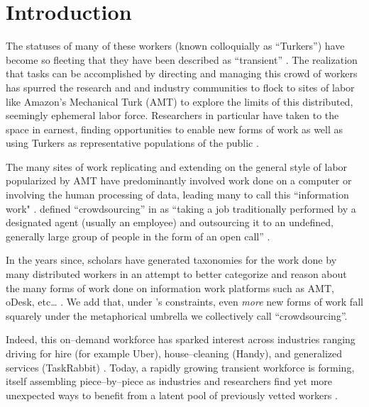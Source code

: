 \documentclass[trackingWork]{subfiles}
\begin{document}

\section{Introduction}
The statuses of many of these workers
(known colloquially as ``Turkers'')
have become so fleeting that 
they have been described as ``transient''
\cite{kargerIterativeLearning,mitraComparingStrategies,latozaCrowdDev}.
The realization
that tasks can be accomplished by directing and managing this crowd of workers
has spurred the research and and industry communities to flock to sites of labor
like Amazon's Mechanical Turk (AMT)
to explore the limits of this distributed, seemingly ephemeral labor force.
Researchers in particular have taken to the space in earnest,
finding opportunities to enable new forms of work
as well as using Turkers
as representative populations of the public
\cite{bernsteinSoylent,redballoon,paolacci2010running}.

The many sites of work replicating and extending on
the general style of labor popularized by AMT
have predominantly involved work done on a computer
or involving the human processing of data,
leading many to call this ``information work"
\cite{turkopticon,professionalCrowdworkEthics,IraniFromCriticalDesign,OlsonMakeDistanceWorkWork}.
\citeauthor{howe2008crowdsourcing} defined ``crowdsourcing'' in \citeyear{howe2008crowdsourcing}
as
``taking a job traditionally performed by a designated agent
(usually an employee)
and outsourcing it to an undefined,
generally large group of people in the form of an open call''
\cite{howe2008crowdsourcing}.

In the years since,
scholars have generated taxonomies for the work done by many distributed workers
in an attempt to better categorize and reason about the many forms of work done 
on information work platforms such as AMT, oDesk, etc\dots
\cite{yuenSurvey,geiger2011managing,quinnbedersonTaxonomy}.
We add that,
under \citeauthor{howe2008crowdsourcing}'s constraints,
even \textit{more} new forms of work fall squarely under
the metaphorical umbrella we collectively call ``crowdsourcing''.

Indeed, this on--demand workforce has sparked interest
across industries ranging
driving for hire (for example Uber),
house--cleaning (Handy),
and generalized services (TaskRabbit)
\cite{uberOfficial,zaarlyOfficial,taskrabbitOfficial}.
Today, a rapidly growing transient workforce is forming,
itself assembling piece--by--piece as industries and researchers find yet more unexpected ways
to benefit from a latent pool of previously vetted workers
\cite{pewSharing}.
\end{document}

